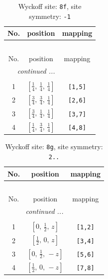 \documentclass[fleqn,8pt]{jsarticle}
\begin{document}
\renewcommand{\arraystretch}{1.2}
\begin{longtable}{ccc}
\caption{Wyckoff site: {\tt 8f}, site symmetry: {\tt -1}}
 \\
 \hline \hline
No. & position & mapping \\ \hline \endfirsthead

\multicolumn{2}{l}{\tablename\ \thetable{}} \\
 \hline \hline
No. & position & mapping \\ \hline \endhead

 \hline \hline
\multicolumn{2}{r}{\footnotesize\it continued ...} \\ \endfoot

 \hline \hline
\multicolumn{2}{r}{} \\ \endlastfoot

1 & $\left[ \frac{1}{4},\, \frac{1}{4},\, \frac{1}{4} \right]$ & {\tt [1,5]} \\ \hline
2 & $\left[ \frac{3}{4},\, \frac{3}{4},\, \frac{1}{4} \right]$ & {\tt [2,6]} \\ \hline
3 & $\left[ \frac{3}{4},\, \frac{1}{4},\, \frac{1}{4} \right]$ & {\tt [3,7]} \\ \hline
4 & $\left[ \frac{1}{4},\, \frac{3}{4},\, \frac{1}{4} \right]$ & {\tt [4,8]} \\
\end{longtable}
\renewcommand{\arraystretch}{1.2}
\begin{longtable}{ccc}
\caption{Wyckoff site: {\tt 8g}, site symmetry: {\tt 2..}}
 \\
 \hline \hline
No. & position & mapping \\ \hline \endfirsthead

\multicolumn{2}{l}{\tablename\ \thetable{}} \\
 \hline \hline
No. & position & mapping \\ \hline \endhead

 \hline \hline
\multicolumn{2}{r}{\footnotesize\it continued ...} \\ \endfoot

 \hline \hline
\multicolumn{2}{r}{} \\ \endlastfoot

1 & $\left[ 0,\, \frac{1}{2},\, z \right]$ & {\tt [1,2]} \\ \hline
2 & $\left[ \frac{1}{2},\, 0,\, z \right]$ & {\tt [3,4]} \\ \hline
3 & $\left[ 0,\, \frac{1}{2},\, - z \right]$ & {\tt [5,6]} \\ \hline
4 & $\left[ \frac{1}{2},\, 0,\, - z \right]$ & {\tt [7,8]} \\
\end{longtable}
\end{document}
